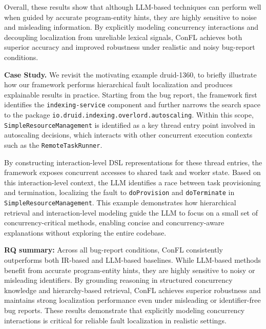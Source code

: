 \vspace{-8pt}

\vspace{-8pt}

Overall, these results show that although LLM-based techniques can perform well when guided by accurate program-entity hints, they are highly sensitive to noise and misleading information.
By explicitly modeling concurrency interactions and decoupling localization from unreliable lexical signals, ConFL achieves both superior accuracy and improved robustness under realistic and noisy bug-report conditions.

\noindent
\textbf{Case Study.} We revisit the motivating example druid-1360, to briefly illustrate how our framework performs hierarchical fault localization and produces explainable results in practice.
Starting from the bug report, the framework first identifies the \texttt{indexing-service} component and further narrows the search space to the package \texttt{io.druid.indexing.overlord.autoscaling}.
Within this scope, \texttt{SimpleResourceManagement} is identified as a key thread entry point involved in autoscaling decisions, which interacts with other concurrent execution contexts such as the \texttt{RemoteTaskRunner}.

By constructing interaction-level DSL representations for these thread entries, the framework exposes concurrent accesses to shared task and worker state.
Based on this interaction-level context, the LLM identifies a race between task provisioning and termination, localizing the fault to \texttt{doProvision} and \texttt{doTerminate} in \texttt{SimpleResourceManagement}.
This example demonstrates how hierarchical retrieval and interaction-level modeling guide the LLM to focus on a small set of concurrency-critical methods, enabling concise and concurrency-aware explanations without exploring the entire codebase.

\vspace{-0.5em}
\vspace*{3pt}
\begin{tcolorbox}
{\bf RQ\thefindingsCounter{} summary:} {
Across all bug-report conditions, ConFL consistently outperforms both IR-based and LLM-based baselines.
While LLM-based methods benefit from accurate program-entity hints, they are highly sensitive to noisy or misleading identifiers.
By grounding reasoning in structured concurrency knowledge and hierarchy-based retrieval, ConFL achieves superior robustness and maintains strong localization performance even under misleading or identifier-free bug reports.
These results demonstrate that explicitly modeling concurrency interactions is critical for reliable fault localization in realistic settings.
}
\end{tcolorbox}

